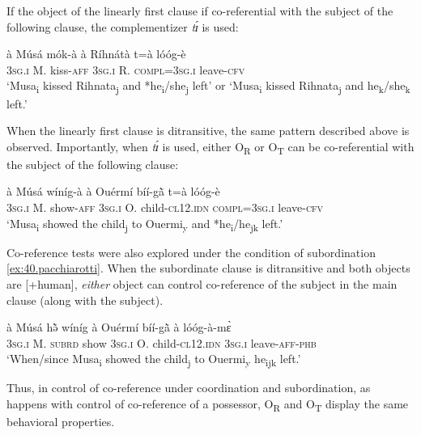 \documentclass[output=paper]{langsci/langscibook}
\begin{document}
If the object of the linearly first clause if co-referential with the subject of the following clause, the complementizer \textit{tɪ́} is used:

\ea
\label{ex:38.pacchiarotti}
\gll \`{a}    M\'{u}s\'{a}  m\'{o}k-\`{a}    \`{a}    R\'{i}hn\'{a}t\`{a}  t=\`{a}        l\'{o}\'{o}g-\`{e}\\
\textsc{3sg.i  }  M.  kiss-\textsc{aff}  \textsc{3sg.i  }  R.    \textsc{compl=3sg.i  }    leave-\textsc{cfv}\\
\glt `Musa\textsubscript{i} kissed Rihnata\textsubscript{j} and *he\textsubscript{i}/she\textsubscript{j} left' or `Musa\textsubscript{i} kissed Rihnata\textsubscript{j} and he\textsubscript{k}/she\textsubscript{k} left.'
\z

When the linearly first clause is ditransitive, the same pattern described above is observed. Importantly, when \textit{tɪ́} is used, either O\textsubscript{R} or O\textsubscript{T} can be co-referential with the subject of the following clause:

\ea
\label{ex:39.pacchiarotti}
\gll \`{a}    M\'{u}s\'{a}  w\'{i}n\'{i}g-\`{a}  \`{a}    Ou\'{e}rm\'{i}  b\'{i}\'{i}-g\`{\~{a}}  t=\`{a}      l\'{o}\'{o}g-\`{e} \\     
\textsc{3sg.i  }  M.  show-\textsc{aff}  \textsc{3sg.i  }  O.    child-\textsc{cl12.idn} \textsc{  compl=3sg.i}        leave-\textsc{cfv}\\
\glt `Musa\textsubscript{i}  showed the child\textsubscript{j} to Ouermi\textsubscript{y} and *he\textsubscript{i}/he\textsubscript{jk} left.'
\z

Co-reference tests were also explored under the condition of subordination \ref{ex:40.pacchiarotti}. When the subordinate clause is ditransitive and both objects are [+human], \textit{either} object can control co-reference of the subject in the main clause (along with the subject).

\ea
\label{ex:40.pacchiarotti}
\gll \`{a} M\'{u}s\'{a} hə̃̀ w\'{i}n\'{i}g \`{a} Ou\'{e}rm\'{i} b\'{i}\'{i}-g\`{\~{a}} \`{a} l\'{o}\'{o}g-\`{a}-mɛ̀\\
\textsc{3sg.i  }  M.  \textsc{subrd}    show  \textsc{3sg.i  }  O.        child-\textsc{cl12.idn} \textsc{3sg.i  }  leave-\textsc{aff-phb}\\
\glt `When/since Musa\textsubscript{i} showed the child\textsubscript{j} to Ouermi\textsubscript{y} he\textsubscript{ijk} left.'
\z

Thus, in control of co-reference under coordination and subordination, as happens with control of co-reference of a possessor, O\textsubscript{R} and O\textsubscript{T} display the same behavioral properties. 
\end{document}

